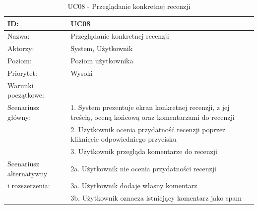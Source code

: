 \begin{table}[H]
    \begin{tabular}{|p{5cm}|p{9cm}|}\hline
    ID: & UC08 \\\hline
    Nazwa: & Przeglądanie konkretnej recenzji \\\hline
    Aktorzy: & System, Użytkownik \\\hline
    Poziom: & Poziom użytkownika  \\\hline
    Priorytet: & Wysoki \\\hline
    Warunki początkowe: & ~ \\\hline
    Scenariusz główny: & 1. System prezentuje ekran konkretnej recenzji, z jej treścią, oceną końcową oraz komentarzami do recenzji \\
    ~ & 2. Użytkownik ocenia przydatność recenzji poprzez kliknięcie odpowiedniego przycisku \\
    ~ & 3. Użytkownik przegląda komentarze do recenzji \\\hline
    Scenariusz alternatywny & 2a. Użytkownik nie ocenia przydatności recenzji \\
    i rozszerzenia: & 3a. Użytkownik dodaje własny komentarz \\
    ~ & 3b. Użytkownik oznacza istniejący komentarz jako spam \\
    \hline\end{tabular}
	\caption{UC08 - Przeglądanie konkretnej recenzji}
\end{table}

